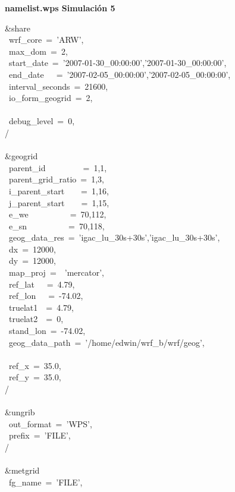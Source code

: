 
\textbf{namelist.wps Simulación 5}

\&share\\
~wrf\_core~=~'ARW',\\
~max\_dom~=~2,\\
~start\_date~=~'2007-01-30\_00:00:00','2007-01-30\_00:00:00',\\
~end\_date~~~=~'2007-02-05\_00:00:00','2007-02-05\_00:00:00',\\
~interval\_seconds~=~21600,\\
~io\_form\_geogrid~=~2,\\
\\
~debug\_level~=~0,\\
/\\
\\
\&geogrid\\
~parent\_id~~~~~~~~~=~1,1,\\
~parent\_grid\_ratio~=~1,3,\\
~i\_parent\_start~~~~=~1,16,\\
~j\_parent\_start~~~~=~1,15,\\
~e\_we~~~~~~~~~~=~70,112,\\
~e\_sn~~~~~~~~~~=~70,118,\\
~geog\_data\_res~=~'igac\_lu\_30s+30s','igac\_lu\_30s+30s',\\
~dx~=~12000,\\
~dy~=~12000,\\
~map\_proj~=~~'mercator',\\
~ref\_lat~~~=~4.79,\\
~ref\_lon~~~=~-74.02,\\
~truelat1~~=~4.79,\\
~truelat2~~=~0,\\
~stand\_lon~=~-74.02,\\
~geog\_data\_path~=~'/home/edwin/wrf\_b/wrf/geog',\\
\\
~ref\_x~=~35.0,\\
~ref\_y~=~35.0,\\
/\\
\\
\&ungrib\\
~out\_format~=~'WPS',\\
~prefix~=~'FILE',\\
/\\
\\
\&metgrid\\
~fg\_name~=~'FILE',\\
